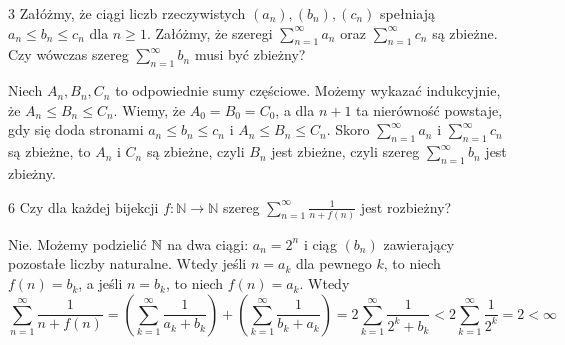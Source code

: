 \documentclass{../note}
\begin{document}
\begin{zadanie}{3}
Załóżmy, że ciągi liczb rzeczywistych $(a_{n}),(b_{n}),(c_{n})$ spełniają $a_{n}\le b_{n}\le c_{n}$ dla $n\ge1$. Załóżmy, że szeregi $\sum_{n=1}^{\infty}a_{n}$ oraz $\sum_{n=1}^{\infty}c_{n}$ są zbieżne. Czy wówczas szereg $\sum_{n=1}^{\infty}b_{n}$ musi być zbieżny?
\end{zadanie}
\begin{rozwiazanie}
Niech $A_n, B_n, C_n$ to odpowiednie sumy częściowe. Możemy wykazać indukcyjnie, że $A_n \leq B_n \leq C_n$. Wiemy, że $A_0 = B_0 = C_0$, a dla $n+1$ ta nierówność powstaje, gdy się doda stronami $a_{n}\le b_{n}\le c_{n}$ i $A_n \leq B_n \leq C_n$. Skoro $\sum_{n=1}^{\infty}a_{n}$ i $\sum_{n=1}^{\infty}c_{n}$ są zbieżne, to $A_n$ i $C_n$ są zbieżne, czyli $B_n$ jest zbieżne, czyli szereg $\sum_{n=1}^{\infty}b_{n}$ jest zbieżny.
\end{rozwiazanie}


\begin{zadanie}{6}
Czy dla każdej bijekcji $f:\mathbb{N}\rightarrow\mathbb{N}$ szereg
$ \sum_{n=1}^{\infty}\frac{1}{n+f(n)} $
jest rozbieżny?
\end{zadanie}
\begin{rozwiazanie}
Nie. Możemy podzielić $\mathbb{N}$ na dwa ciągi: $a_n = 2^n$ i ciąg $(b_n)$ zawierający pozostałe liczby naturalne. Wtedy jeśli $n = a_k$ dla pewnego $k$, to niech $f(n) = b_k$, a jeśli $n = b_k$, to niech $f(n) = a_k$. Wtedy
\[\sum_{n=1}^{\infty}\frac{1}{n+f(n)} = \left(\sum_{k=1}^{\infty}\frac{1}{a_k+b_k}\right) + \left(\sum_{k=1}^{\infty}\frac{1}{b_k+a_k}\right) = 2\sum_{k=1}^{\infty}\frac{1}{2^k+b_k} < 2\sum_{k=1}^{\infty}\frac{1}{2^k} = 2 < \infty\]
\end{rozwiazanie}
\end{document}
